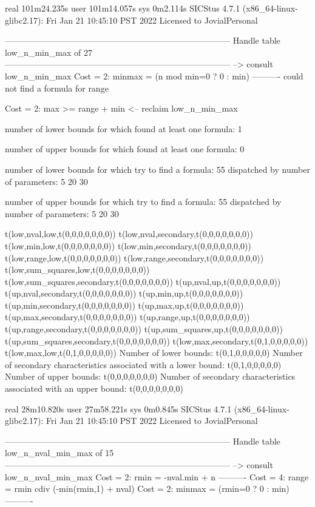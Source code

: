 real	101m24.235s
user	101m14.057s
sys	0m2.114s
SICStus 4.7.1 (x86_64-linux-glibc2.17): Fri Jan 21 10:45:10 PST 2022
Licensed to JovialPersonal


--------------------------------------------------------------------------------
Handle table low_n_min_max of 27
--------------------------------------------------------------------------------
--> consult low_n_min_max
Cost =  2:  minmax = (n mod min=0 ? 0 : min)
----------
could not find a formula for range

Cost =  2:  max >= range + min
<-- reclaim low_n_min_max

number of lower bounds for which found at least one formula: 1

number of upper bounds for which found at least one formula: 0

number of lower bounds for which try to find a formula: 55
dispatched by number of parameters: 5  20  30

number of upper bounds for which try to find a formula: 55
dispatched by number of parameters: 5  20  30

t(low,nval,low,t(0,0,0,0,0,0,0))
t(low,nval,secondary,t(0,0,0,0,0,0,0))
t(low,min,low,t(0,0,0,0,0,0,0))
t(low,min,secondary,t(0,0,0,0,0,0,0))
t(low,range,low,t(0,0,0,0,0,0,0))
t(low,range,secondary,t(0,0,0,0,0,0,0))
t(low,sum_squares,low,t(0,0,0,0,0,0,0))
t(low,sum_squares,secondary,t(0,0,0,0,0,0,0))
t(up,nval,up,t(0,0,0,0,0,0,0))
t(up,nval,secondary,t(0,0,0,0,0,0,0))
t(up,min,up,t(0,0,0,0,0,0,0))
t(up,min,secondary,t(0,0,0,0,0,0,0))
t(up,max,up,t(0,0,0,0,0,0,0))
t(up,max,secondary,t(0,0,0,0,0,0,0))
t(up,range,up,t(0,0,0,0,0,0,0))
t(up,range,secondary,t(0,0,0,0,0,0,0))
t(up,sum_squares,up,t(0,0,0,0,0,0,0))
t(up,sum_squares,secondary,t(0,0,0,0,0,0,0))
t(low,max,secondary,t(0,1,0,0,0,0,0))
t(low,max,low,t(0,1,0,0,0,0,0))
Number of lower bounds:                                             t(0,1,0,0,0,0,0)
Number of secondary characteristics associated with a lower bound:  t(0,1,0,0,0,0,0)
Number of upper bounds:                                             t(0,0,0,0,0,0,0)
Number of secondary characteristics associated with an upper bound: t(0,0,0,0,0,0,0)

real	28m10.820s
user	27m58.221s
sys	0m0.845s
SICStus 4.7.1 (x86_64-linux-glibc2.17): Fri Jan 21 10:45:10 PST 2022
Licensed to JovialPersonal


--------------------------------------------------------------------------------
Handle table low_n_nval_min_max of 15
--------------------------------------------------------------------------------
--> consult low_n_nval_min_max
Cost =  2:  rmin   = -nval.min + n
----------
Cost =  4:  range  = rmin cdiv (-min(rmin,1) + nval)
Cost =  2:  minmax = (rmin=0 ? 0 : min)
----------

